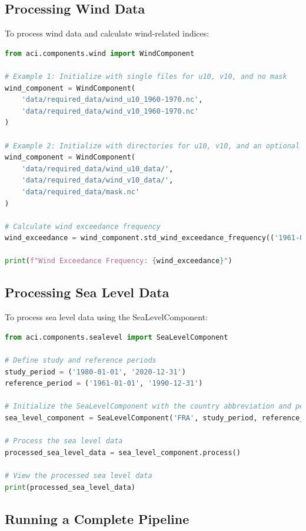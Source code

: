 \documentclass[a4paper,12pt]{article}
\begin{document}
\subsection{Processing Wind Data}

To process wind data and calculate wind-related indices:

\begin{lstlisting}[language=python]
from aci.components.wind import WindComponent

# Example 1: Initialize with single files for u10, v10, and no mask
wind_component = WindComponent(
    'data/required_data/wind_u10_1960-1970.nc',
    'data/required_data/wind_v10_1960-1970.nc'
)

# Example 2: Initialize with directories for u10, v10, and an optional mask
wind_component = WindComponent(
    'data/required_data/wind_u10_data/', 
    'data/required_data/wind_v10_data/',
    'data/required_data/mask.nc'
)

# Calculate wind exceedance frequency
wind_exceedance = wind_component.std_wind_exceedance_frequency(('1961-01-01', '1990-12-31'))

print(f"Wind Exceedance Frequency: {wind_exceedance}")
\end{lstlisting}

\subsection{Processing Sea Level Data}

To process sea level data using the SeaLevelComponent:

\begin{lstlisting}[language=python]
from aci.components.sealevel import SeaLevelComponent

# Define study and reference periods
study_period = ('1980-01-01', '2020-12-31')
reference_period = ('1961-01-01', '1990-12-31')

# Initialize the SeaLevelComponent with the country abbreviation and periods
sea_level_component = SeaLevelComponent('FRA', study_period, reference_period)

# Process the sea level data
processed_sea_level_data = sea_level_component.process()

# View the processed sea level data
print(processed_sea_level_data)
\end{lstlisting}

\subsection{Running a Complete Pipeline}
\end{document}
